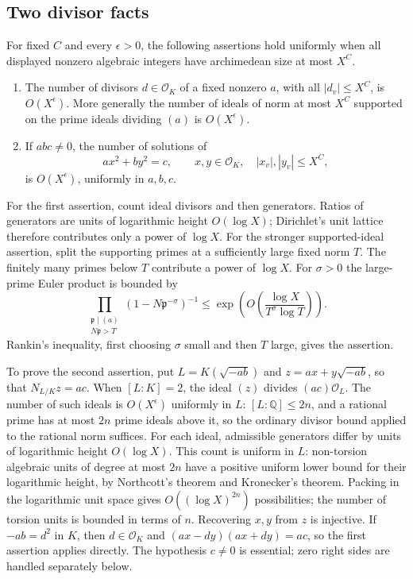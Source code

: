 \documentclass[11pt,reqno]{amsart}
\numberwithin{equation}{section}
\theoremstyle{definition}
\begin{document}
\subsection{Two divisor facts}

For fixed $C$ and every $\epsilon>0$, the following assertions hold uniformly
when all displayed nonzero algebraic integers have archimedean size at most $X^C$.

\begin{enumerate}
\item The number of divisors $d\in\mathcal O_K$ of a fixed nonzero $a$, with
all $|d_v|\le X^C$, is $O(X^\epsilon)$.  More generally the number of ideals
of norm at most $X^C$ supported on the prime ideals dividing $(a)$ is
$O(X^\epsilon)$.
\item If $abc\ne0$, the number of solutions of
\begin{equation}\label{eq:g6-binary}
 ax^2+by^2=c,
 \qquad x,y\in\mathcal O_K,\quad |x_v|,|y_v|\le X^C,
\end{equation}
is $O(X^\epsilon)$, uniformly in $a,b,c$.
\end{enumerate}

For the first assertion, count ideal divisors and then generators.  Ratios of
generators are units of logarithmic height $O(\log X)$; Dirichlet's unit lattice
therefore contributes only a power of $\log X$.  For the stronger supported-ideal
assertion, split the supporting primes at a sufficiently large fixed norm $T$.
The finitely many primes below $T$ contribute a power of $\log X$.
For $\sigma>0$ the large-prime Euler product is bounded by
\[
 \prod_{\substack{\mathfrak p\mid(a)\\N\mathfrak p>T}}
 (1-N\mathfrak p^{-\sigma})^{-1}
 \le \exp\!\left(O\!\left(\frac{\log X}{T^\sigma\log T}\right)\right).
\]
Rankin's inequality, first choosing $\sigma$ small and then $T$ large, gives
the assertion.

To prove the second assertion, put $L=K(\sqrt{-ab})$ and
$z=ax+y\sqrt{-ab}$, so that $N_{L/K}z=ac$.
When $[L:K]=2$, the ideal $(z)$ divides $(ac)\mathcal O_L$.
The number of such ideals is $O(X^\epsilon)$ uniformly in $L$:
$[L:\mathbb Q]\le2n$, and a rational prime has at most $2n$ prime ideals above it,
so the ordinary divisor bound applied to the rational norm suffices.
For each ideal, admissible generators differ by units of logarithmic height
$O(\log X)$.  This count is uniform in $L$: non-torsion algebraic units of
degree at most $2n$ have a positive uniform lower bound for their logarithmic
height, by Northcott's theorem and Kronecker's theorem.  Packing in the
logarithmic unit space gives $O((\log X)^{2n})$ possibilities; the number of
torsion units is bounded in terms of $n$.  Recovering $x,y$ from $z$ is injective.
If $-ab=d^2$ in $K$, then $d\in\mathcal O_K$ and
$(ax-dy)(ax+dy)=ac$, so the first assertion applies directly.
The hypothesis $c\ne0$ is essential; zero right sides are handled separately below.
\end{document}
